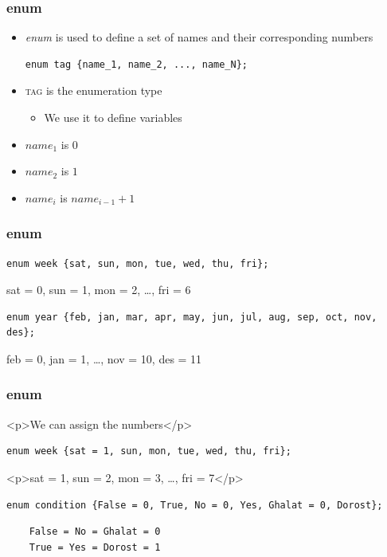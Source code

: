 \documentclass{../c-lecture}
\begin{document}
\begin{frame}[fragile]
  \frametitle{enum}
  \begin{itemize}
    \item
      \textit{\color{LimeGreen} enum} is used to define a set of names and
      their corresponding numbers

    \begin{verbatim}
enum tag {name_1, name_2, ..., name_N};
    \end{verbatim}
    \item \textsc{\color{Yellow} tag} is the enumeration type
    \begin{itemize}
      \item We use it to define variables
    \end{itemize}
    \item
      $name_1$ is $0$
    \item
      $name_2$ is $1$
    \item
      $name_{i}$ is $name_{i-1} + 1$

  \end{itemize}
\end{frame}

\begin{frame}[fragile]
  \frametitle{enum}
  \begin{verbatim}
enum week {sat, sun, mon, tue, wed, thu, fri};
  \end{verbatim}
  sat = 0, sun = 1, mon = 2, \ldots, fri = 6

  \begin{verbatim}
enum year {feb, jan, mar, apr, may, jun, jul, aug, sep, oct, nov, des};
  \end{verbatim}
  feb = 0, jan = 1, \ldots, nov = 10, des = 11
\end{frame}

\begin{frame}[fragile]
  \frametitle{enum}
  <p>We can assign the numbers</p>
  \begin{verbatim}
enum week {sat = 1, sun, mon, tue, wed, thu, fri};
  \end{verbatim}
  <p>sat = 1, sun = 2, mon = 3, …, fri = 7</p>
  \begin{verbatim}
enum condition {False = 0, True, No = 0, Yes, Ghalat = 0, Dorost};
  \end{verbatim}
  \begin{verbatim}
    False = No = Ghalat = 0
    True = Yes = Dorost = 1
  \end{verbatim}
\end{frame}
\end{document}
